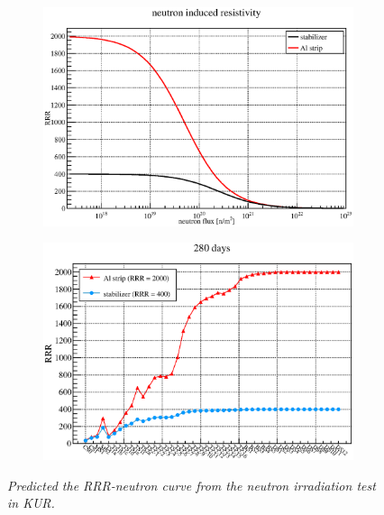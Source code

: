  \begin{figure}[H]
   \begin{subfigure}{0.3\textwidth}
    \centering
	\includegraphics[scale=0.43]{chapter5/fig/degradation.eps}
   \end{subfigure}
   \hspace{0.2\textwidth}
   \begin{subfigure}{0.3\textwidth}
    \centering
	\includegraphics[scale=0.43]{chapter5/fig/rrrmagnets.eps}
   \end{subfigure}
   \caption{\it Predicted the RRR-neutron curve from the neutron irradiation test in KUR.}
   \label{4rrr}
  \end{figure}

